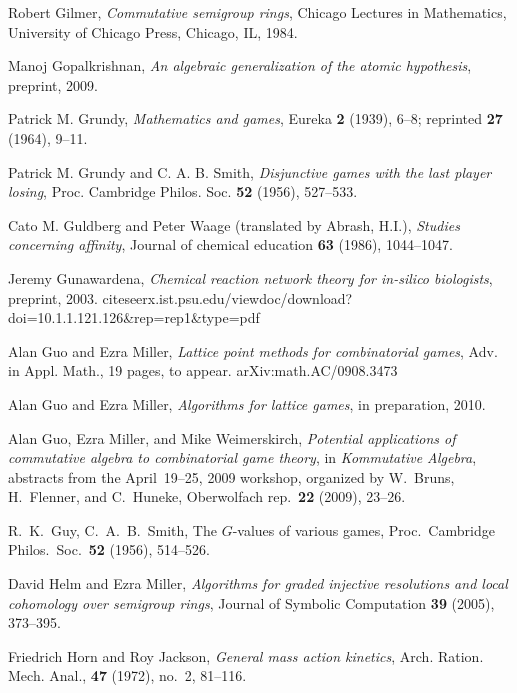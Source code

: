 \documentclass[12pt]{amsart}
\numberwithin{equation}{section}
\theoremstyle{definition}
\begin{document}
Robert Gilmer, \emph{Commutative semigroup rings}, Chicago Lectures in
  Mathematics, University of Chicago Press, Chicago, IL, 1984.

Manoj Gopalkrishnan, \emph{An algebraic generalization of the atomic
  hypothesis}, preprint, 2009.

Patrick M. Grundy, \textit{Mathematics and games}, Eureka \textbf{2}
  (1939), 6--8; reprinted \textbf{27} (1964), 9--11.

Patrick M. Grundy and C. A. B. Smith, \emph{Disjunctive games with the
  last player losing}, Proc. Cambridge Philos. Soc. \textbf{52}
  (1956), 527--533.

Cato M. Guldberg and Peter Waage (translated by Abrash, H.I.),
  \emph{Studies concerning affinity}, Journal of chemical education
  \textbf{63} (1986), 1044--1047.

Jeremy Gunawardena, \emph{Chemical reaction network theory for
\emph{in-silico} biologists}, preprint, 2003.  \textsf{citeseerx.ist.psu.edu/viewdoc/download?doi=10.1.1.121.126\&rep=rep1\&type=pdf}

Alan Guo and Ezra Miller, \emph{Lattice point methods for
  combinatorial games}, Adv. in Appl. Math., 19 pages, to appear.
  \textsf{arXiv:math.AC/0908.3473}

Alan Guo and Ezra Miller, \emph{Algorithms for lattice games}, in
  preparation, 2010.

Alan Guo, Ezra Miller, and Mike Weimerskirch,
  \emph{Potential applications of commutative algebra to combinatorial
  game theory}, in \emph{Kommutative Algebra}, abstracts from the
  April~19--25, 2009 workshop, organized by W.~Bruns, H.~Flenner, and
  C.~Huneke, Oberwolfach rep.~\textbf{22} (2009), 23--26.

R.\ K.\ Guy, C.\ A.\ B.\ Smith, The $G$-values of various games,
  Proc.\ Cambridge Philos.\ Soc.\ \textbf{52} (1956), 514--526.

David Helm and Ezra Miller,
  \emph{Algorithms for graded injective resolutions and local
  cohomology over semigroup rings}, Journal of Symbolic Computation
  \textbf{39} (2005), 373--395.

Friedrich Horn and Roy Jackson, \emph{General mass action kinetics},
  Arch. Ration. Mech. Anal., \textbf{47} (1972), no.~2, 81--116.
\end{document}
